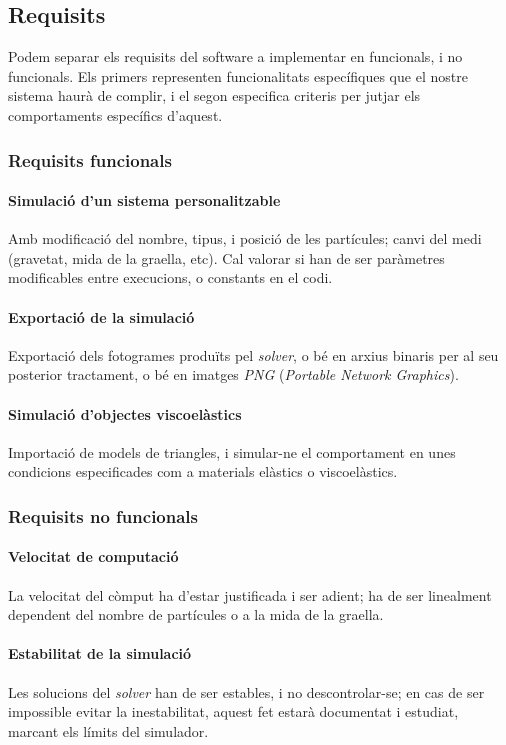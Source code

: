 \documentclass[a4paper]{article} %
\begin{document}
	
	\subsection{Requisits}
	Podem separar els requisits del software a implementar en funcionals, i no funcionals. Els primers representen funcionalitats específiques que el nostre sistema haurà de complir, i el segon especifica criteris per jutjar els comportaments específics d'aquest.
	
	\subsubsection{Requisits funcionals}
	\paragraph{\quad Simulació d'un sistema personalitzable} Amb modificació del nombre, tipus, i posició de les partícules; canvi del medi (gravetat, mida de la graella, etc). Cal valorar si han de ser paràmetres modificables entre execucions, o constants en el codi.
	\paragraph{\quad Exportació de la simulació} Exportació dels fotogrames produïts pel \textit{solver}, o bé en arxius binaris per al seu posterior tractament, o bé en imatges \textit{PNG} (\textit{Portable Network Graphics}).
 	\paragraph{\quad Simulació d'objectes viscoelàstics} Importació de models de triangles, i simular-ne el comportament en unes condicions especificades com a materials elàstics o viscoelàstics.
	
	\subsubsection{Requisits no funcionals}
	\paragraph{\quad Velocitat de computació} La velocitat del còmput ha d'estar justificada i ser adient; ha de ser linealment dependent del nombre de partícules o a la mida de la graella.
	\paragraph{\quad Estabilitat de la simulació} Les solucions del \textit{solver} han de ser estables, i no descontrolar-se; en cas de ser impossible evitar la inestabilitat, aquest fet estarà documentat i estudiat, marcant els límits del simulador.
	
\end{document}
